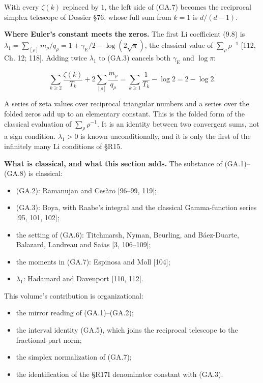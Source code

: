 \documentclass[
  11pt,
]{book}
\providecommand{\tightlist}{%
  \setlength{\itemsep}{0pt}\setlength{\parskip}{0pt}}
\begin{document}
With every \(\zeta(k)\) replaced by \(1\), the left side of (GA.7)
becomes the reciprocal simplex telescope of Dossier §76, whose full sum
from \(k=1\) is \(d/(d-1)\).

\textbf{Where Euler's constant meets the zeros.} The first Li
coefficient (9.8) is
\(\lambda_1=\sum_{[\rho]}m_\rho/q_\rho=1+\gamma_{\mathrm E}/2-\log(2\sqrt\pi)\),
the classical value of \(\sum_\rho\rho^{-1}\) {[}112, Ch. 12; 118{]}.
Adding twice \(\lambda_1\) to (GA.3) cancels both \(\gamma_{\mathrm E}\)
and \(\log\pi\):

\[
\boxed{\sum_{k\ge2}\frac{\zeta(k)}{T_k}+2\sum_{[\rho]}\frac{m_\rho}{q_\rho}
=\sum_{k\ge1}\frac1{T_k}-\log2=2-\log2.}
\tag{GA.8}
\]

A series of zeta values over reciprocal triangular numbers and a series
over the folded zeros add up to an elementary constant. This is the
folded form of the classical evaluation of \(\sum_\rho\rho^{-1}\). It is
an identity between two convergent sums, not a sign condition.
\(\lambda_1>0\) is known unconditionally, and it is only the first of
the infinitely many Li conditions of §R15.

\textbf{What is classical, and what this section adds.} The substance of
(GA.1)--(GA.8) is classical:

\begin{itemize}
\tightlist
\item
  (GA.2): Ramanujan and Cesàro {[}96--99, 119{]};
\item
  (GA.3): Boya, with Raabe's integral and the classical Gamma-function
  series {[}95, 101, 102{]};
\item
  the setting of (GA.6): Titchmarsh, Nyman, Beurling, and Báez-Duarte,
  Balazard, Landreau and Saias {[}3, 106--109{]};
\item
  the moments in (GA.7): Espinosa and Moll {[}104{]};
\item
  \(\lambda_1\): Hadamard and Davenport {[}110, 112{]}.
\end{itemize}

This volume's contribution is organizational:

\begin{itemize}
\tightlist
\item
  the mirror reading of (GA.1)--(GA.2);
\item
  the interval identity (GA.5), which joins the reciprocal telescope to
  the fractional-part norm;
\item
  the simplex normalization of (GA.7);
\item
  the identification of the §R17I denominator constant with (GA.3).
\end{itemize}
\end{document}
